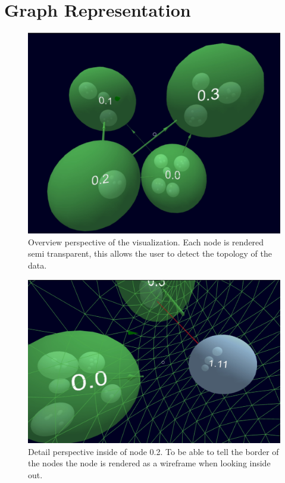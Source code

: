 \section{Graph Representation}
\label{chap:ps-graphRepresentation}
\begin{figure}[!htb]
    \centering
    \includegraphics[width=1\textwidth]{graphics/screenshotNesting.jpg}
    \caption{Overview perspective of the visualization. Each node is rendered semi transparent, this allows the user to detect the topology of the data.}
    \label{fig:ps_nestedLayout}
\end{figure}
\begin{figure}[!htb]
    \centering
    \includegraphics[width=1\textwidth]{graphics/screenshotNestingAndWireframe.jpg}
    \caption{Detail perspective inside of node 0.2. To be able to tell the border of the nodes the node is rendered as a wireframe when looking inside out.}
    \label{fig:ps_wireframe}
\end{figure}
